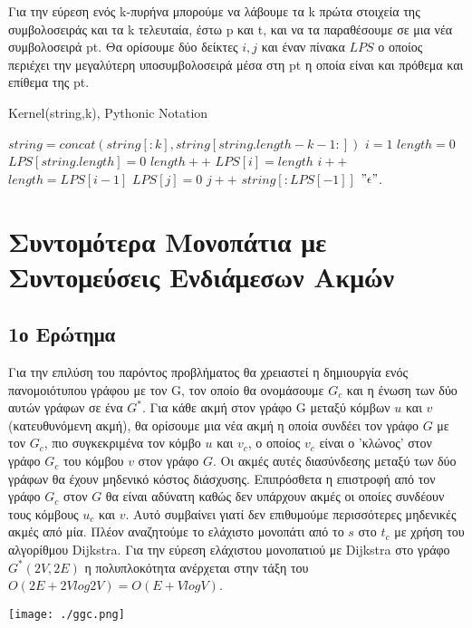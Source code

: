\documentclass{article}
\begin{document}
Για την εύρεση ενός k-πυρήνα μπορούμε να λάβουμε τα k πρώτα στοιχεία της συμβολοσειράς και τα k τελευταία,
έστω p και t, και να τα παραθέσουμε σε μια νέα συμβολοσειρά pt. Θα ορίσουμε δύο δείκτες $i,j$ και έναν
πίνακα $LPS$ ο οποίος περιέχει την μεγαλύτερη υποσυμβολοσειρά μέσα στη pt η οποία είναι και πρόθεμα και επίθεμα της pt.\\


\begin{algorithm}
    \caption{Kernel(string,k), Pythonic Notation} 
    \begin{algorithmic}[1]
            \State $string = concat(string[:k],string[string.length - k - 1:])$
        \EndIf
        \State $i = 1$
        \State $length = 0$
        \State $LPS[string.length] = 0$
         
                \State $length++$
                \State $LPS[i] = length$
                \State $i++$
            \Else
                    \State $length = LPS[i-1]$
                \Else
                    \State $LPS[j] = 0$
                    \State $j++$
                \EndIf
            \EndIf
        \EndWhile
            \Return $string[:LPS[-1]]$
        \EndIf
        \Return $"\epsilon"$.

    \end{algorithmic}
\end{algorithm}
\pagebreak
\section{Συντομότερα Μονοπάτια με Συντομεύσεις Ενδιάμεσων Ακμών}
\subsection{1ο Ερώτημα}
Για την επιλύση του παρόντος προβλήματος θα χρειαστεί η δημιουργία ενός πανομοιότυπου γράφου με τον G,
τον οποίο θα ονομάσουμε $G_c$ και η ένωση των δύο αυτών γράφων σε ένα $G^*$. Για κάθε ακμή στον γράφο G μεταξύ κόμβων $u$ και $v$ (κατευθυνόμενη ακμή), θα ορίσουμε μια νέα ακμή
η οποία συνδέει τον γράφο $G$ με τον $G_c$, πιο συγκεκριμένα τον κόμβο $u$ και $v_c$, ο οποίος $v_c$ 
είναι ο 'κλώνος' στον γράφο $G_c$ του κόμβου $v$ στον γράφο $G$. Οι ακμές αυτές διασύνδεσης μεταξύ των
δύο γράφων θα έχουν μηδενικό κόστος διάσχυσης. Επιπρόσθετα η επιστροφή από τον γράφο $G_c$ στον $G$ θα 
είναι αδύνατη καθώς δεν υπάρχουν ακμές οι οποίες συνδέουν τους κόμβους $u_c$ και $v$. Αυτό συμβαίνει 
γιατί δεν επιθυμούμε περισσότερες μηδενικές ακμές από μία. Πλέον αναζητούμε το ελάχιστο μονοπάτι από το 
$s$ στο $t_c$ με χρήση του αλγορίθμου Dijkstra. Για την εύρεση ελάχιστου μονοπατιού με Dijkstra στο γράφο
$G^*(2V,2E)$ η πολυπλοκότητα ανέρχεται στην τάξη του $O(2E + 2Vlog2V) = O(E + VlogV)$.\\
\begin{center}
    \texttt{[image: ./ggc.png]}
\end{center}
\end{document}
